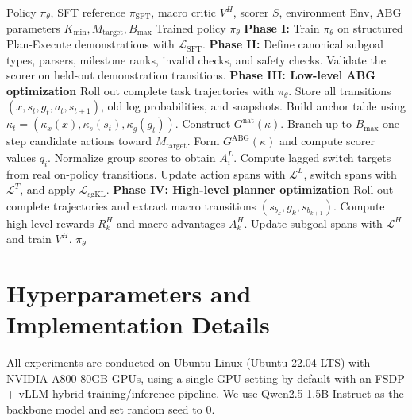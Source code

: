 \documentclass{article}
\begin{document}
\begin{algorithm}[H]
\small
\caption{HSPO with Anchored Branch Grouping}
\label{alg:hspo}
\begin{algorithmic}[1]
\Require Policy $\pi_\theta$, SFT reference $\pi_{\mathrm{SFT}}$, macro critic $V^H$, scorer $S$, environment $\mathrm{Env}$, ABG parameters $K_{\min},M_{\mathrm{target}},B_{\max}$
\Ensure Trained policy $\pi_\theta$
\State \textbf{Phase I:} Train $\pi_\theta$ on structured Plan-Execute demonstrations with $\mathcal{L}_{\mathrm{SFT}}$.
\State \textbf{Phase II:} Define canonical subgoal types, parsers, milestone ranks, invalid checks, and safety checks.
\State Validate the scorer on held-out demonstration transitions.
\State \textbf{Phase III: Low-level ABG optimization}
    \State Roll out complete task trajectories with $\pi_\theta$.
    \State Store all transitions $(x,s_t,g_t,a_t,s_{t+1})$, old log probabilities, and snapshots.
    \State Build anchor table using $\kappa_t=(\kappa_x(x),\kappa_s(s_t),\kappa_g(g_t))$.
        \State Construct $G^{\mathrm{nat}}(\kappa)$.
            \State Branch up to $B_{\max}$ one-step candidate actions toward $M_{\mathrm{target}}$.
        \EndIf
        \State Form $G^{\mathrm{ABG}}(\kappa)$ and compute scorer values $q_i$.
        \State Normalize group scores to obtain $A_i^L$.
    \EndFor
    \State Compute lagged switch targets from real on-policy transitions.
    \State Update action spans with $\mathcal{L}^L$, switch spans with $\mathcal{L}^T$, and apply $\mathcal{L}_{\mathrm{sgKL}}$.
\EndFor
\State \textbf{Phase IV: High-level planner optimization}
    \State Roll out complete trajectories and extract macro transitions $(s_{b_k},g_k,s_{b_{k+1}})$.
    \State Compute high-level rewards $R_k^H$ and macro advantages $A_k^H$.
    \State Update subgoal spans with $\mathcal{L}^H$ and train $V^H$.
\EndFor
\State \Return $\pi_\theta$
\end{algorithmic}
\end{algorithm}

\section{Hyperparameters and Implementation Details}

All experiments are conducted on Ubuntu Linux (Ubuntu 22.04 LTS) with NVIDIA A800-80GB GPUs, using a single-GPU setting by default with an FSDP + vLLM hybrid training/inference pipeline. We use Qwen2.5-1.5B-Instruct as the backbone model and set random seed to 0.
\end{document}
